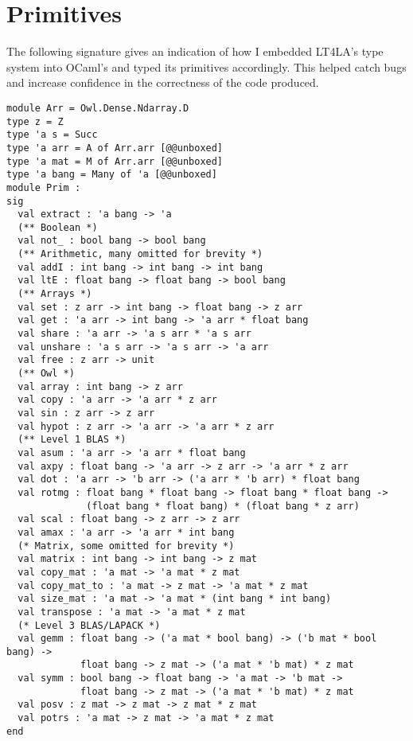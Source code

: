 \chapter{Primitives}\label{chap:primitives}

The following signature gives an indication of how I embedded LT4LA's type
system into OCaml's and typed its primitives accordingly. This helped catch
bugs and increase confidence in the correctness of the code produced.

\begin{verbatim}
module Arr = Owl.Dense.Ndarray.D
type z = Z
type 'a s = Succ
type 'a arr = A of Arr.arr [@@unboxed]
type 'a mat = M of Arr.arr [@@unboxed]
type 'a bang = Many of 'a [@@unboxed]
module Prim :
sig
  val extract : 'a bang -> 'a
  (** Boolean *)
  val not_ : bool bang -> bool bang
  (** Arithmetic, many omitted for brevity *)
  val addI : int bang -> int bang -> int bang
  val ltE : float bang -> float bang -> bool bang
  (** Arrays *)
  val set : z arr -> int bang -> float bang -> z arr
  val get : 'a arr -> int bang -> 'a arr * float bang
  val share : 'a arr -> 'a s arr * 'a s arr
  val unshare : 'a s arr -> 'a s arr -> 'a arr
  val free : z arr -> unit
  (** Owl *)
  val array : int bang -> z arr
  val copy : 'a arr -> 'a arr * z arr
  val sin : z arr -> z arr
  val hypot : z arr -> 'a arr -> 'a arr * z arr
  (** Level 1 BLAS *)
  val asum : 'a arr -> 'a arr * float bang
  val axpy : float bang -> 'a arr -> z arr -> 'a arr * z arr
  val dot : 'a arr -> 'b arr -> ('a arr * 'b arr) * float bang
  val rotmg : float bang * float bang -> float bang * float bang ->
              (float bang * float bang) * (float bang * z arr)
  val scal : float bang -> z arr -> z arr
  val amax : 'a arr -> 'a arr * int bang
  (* Matrix, some omitted for brevity *)
  val matrix : int bang -> int bang -> z mat
  val copy_mat : 'a mat -> 'a mat * z mat
  val copy_mat_to : 'a mat -> z mat -> 'a mat * z mat
  val size_mat : 'a mat -> 'a mat * (int bang * int bang)
  val transpose : 'a mat -> 'a mat * z mat
  (* Level 3 BLAS/LAPACK *)
  val gemm : float bang -> ('a mat * bool bang) -> ('b mat * bool bang) ->
             float bang -> z mat -> ('a mat * 'b mat) * z mat
  val symm : bool bang -> float bang -> 'a mat -> 'b mat ->
             float bang -> z mat -> ('a mat * 'b mat) * z mat
  val posv : z mat -> z mat -> z mat * z mat
  val potrs : 'a mat -> z mat -> 'a mat * z mat
end
\end{verbatim}
